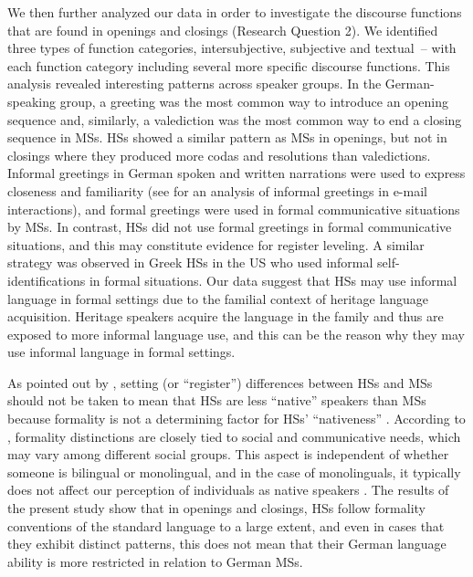 \documentclass[output=paper,colorlinks,citecolor=brown]{langscibook}
\begin{document}
We then further analyzed our data in order to investigate the discourse functions that are found in openings and closings (Research Question 2). We identified three types of function categories, intersubjective, subjective and textual~-- with each function category including several more specific discourse functions. This analysis revealed interesting patterns across speaker groups. In the German-speaking group, a greeting was the most common way to introduce an opening sequence and, similarly, a valediction was the most common way to end a closing sequence in MSs. HSs showed a similar pattern as MSs in openings, but not in closings where they produced more codas and resolutions than valedictions. Informal greetings in German spoken and written narrations were used to express closeness and familiarity (see \textcite{bou-franch_openings_2011} for an analysis of informal greetings in e-mail interactions), and formal greetings were used in formal communicative situations by MSs. In contrast, HSs did not use formal greetings in formal communicative situations, and this may constitute evidence for register leveling. A similar strategy was observed in Greek HSs in the US who used informal self\hyp identifications in formal situations. Our data suggest that HSs may use informal language in formal settings due to the familial context of heritage language acquisition. Heritage speakers acquire the language in the family and thus are exposed to more informal language use, and this can be the reason why they may use informal language in formal settings.

As pointed out by \textcite{wiese_heritage_2022}, setting (or “register”) differences between HSs and MSs should not be taken to mean that HSs are less “native” speakers than MSs because formality is not a determining factor for HSs’ “nativeness” \parencite[cf.][]{montrul_dominant_2012, polinsky_heritage_2018}. According to \textcite{wiese_heritage_2022}, formality distinctions are closely tied to social and communicative needs, which may vary among different social groups. This aspect is independent of whether someone is bilingual or monolingual, and in the case of monolinguals, it typically does not affect our perception of individuals as native speakers \parencite{wiese_heritage_2022}. The results of the present study show that in openings and closings, HSs follow formality conventions of the standard language to a large extent, and even in cases that they exhibit distinct patterns, this does not mean that their German language ability is more restricted in relation to German MSs.  
\end{document}

